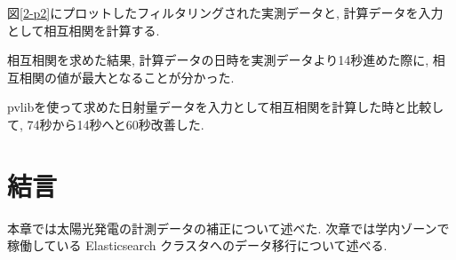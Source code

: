 図\ref{2-p2}にプロットしたフィルタリングされた実測データと, 計算データを入力として相互相関を計算する.

相互相関を求めた結果, 計算データの日時を実測データより14秒進めた際に, 相互相関の値が最大となることが分かった.

pvlibを使って求めた日射量データを入力として相互相関を計算した時と比較して, 74秒から14秒へと60秒改善した.

\section{結言}
本章では太陽光発電の計測データの補正について述べた. 
次章では学内ゾーンで稼働している Elasticsearch クラスタへのデータ移行について述べる.